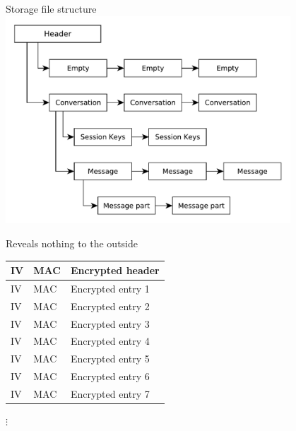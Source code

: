 \documentclass{beamer}
\begin{document}

%


\begin{frame}{Storage file structure}
	\centering
	\includegraphics[width=0.8\textwidth]{storage_file}
\end{frame}

\begin{frame}{Reveals nothing to the outside}
	\begin{tabularx}{\textwidth}{ |l|l|L| }
		\hline
		IV & MAC & Encrypted header \\
		\hline
		IV & MAC & Encrypted entry 1 \\
		\hline
		IV & MAC & Encrypted entry 2 \\
		\hline
		IV & MAC & Encrypted entry 3 \\
		\hline
		IV & MAC & Encrypted entry 4 \\
		\hline
		IV & MAC & Encrypted entry 5 \\
		\hline
		IV & MAC & Encrypted entry 6 \\
		\hline
		IV & MAC & Encrypted entry 7 \\
		\hline
	\end{tabularx}

	\centering
	$\vdots$ \\
\end{frame}
\end{document}
